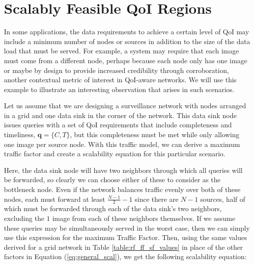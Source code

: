 \section{Scalably Feasible QoI Regions}
\label{sec:scal_feasible_qoi}

In some applications, the data requirements to achieve a certain level of QoI may include a minimum number of nodes or sources in addition to the size of the data load that must be served.  For example, a system may require that each image must come from a different node, perhaps because each node only has one image or maybe by design to provide increased credibility through corroboration, another contextual metric of interest in QoI-aware networks.  We will use this example to illustrate an interesting observation that arises in such scenarios.


Let us assume that we are designing a surveillance network with nodes arranged in a grid and one data sink in the corner of the network.  This data sink node issues queries with a set of QoI requirements that include completeness and timeliness, $\mathbf{q} = \{C,T\}$, but this completeness must be met while only allowing one image per source node.  With this traffic model, we can derive a maximum traffic factor and create a scalability equation for this particular scenario.

Here, the data sink node will have two neighbors through which all queries will be forwarded, so clearly we can choose either of these to consider as the bottleneck node.  Even if the network balances traffic evenly over both of these nodes, each must forward at least $\frac{N-1}{2}-1$ since there are $N-1$ sources, half of which must be forwarded through each of the data sink's two neighbors, excluding the $1$ image from each of these neighbors themselves.  If we assume these queries may be simultaneously served in the worst case, then we can simply use this expression for the maximum Traffic Factor.  Then, using the same values derived for a grid network in Table \ref{table:rf_ff_sf_values} in place of the other factors in Equation (\ref{eq:general_scal}), we get the following scalability equation:


